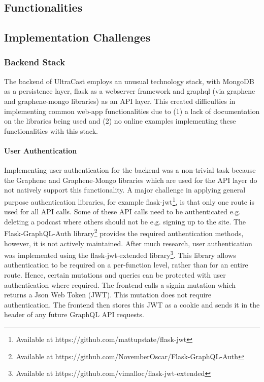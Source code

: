 \documentclass[../report.tex]{subfiles}
\begin{document}
   

\subsection{Functionalities}

\subsection{Implementation Challenges}

\subsubsection{Backend Stack}

The backend of UltraCast employs an unusual technology stack, with MongoDB as a persistence layer, flask as a webserver framework and graphql (via graphene and graphene-mongo libraries) as an API layer.
This created difficulties in implementing common web-app functionalities due to (1) a lack of documentation on the libraries being used and (2) no online examples implementing these functionalities with this stack.

\paragraph{User Authentication}

Implementing user authentication for the backend was a non-trivial task because the Graphene and Graphene-Mongo libraries which are used for the API layer do not natively support this functionality.
A major challenge in applying general purpose authentication libraries, for example flask-jwt\footnote{Available at https://github.com/mattupstate/flask-jwt}, is that only one route is used for all API calls.
Some of these API calls need to be authenticated e.g. deleting a podcast where others should not be e.g. signing up to the site.
The Flask-GraphQL-Auth library\footnote{Available at https://github.com/NovemberOscar/Flask-GraphQL-Auth} provides the required authentication methods, however, it is not actively maintained.
After much research, user authentication was implemented using the flask-jwt-extended library\footnote{Available at https://github.com/vimalloc/flask-jwt-extended}.
This library allows authentication to be required on a per-function level, rather than for an entire route.
Hence, certain mutations and queries can be protected with user authentication where required.
The frontend calls a signin mutation which returns a Json Web Token (JWT).
This mutation does not require authentication.
The frontend then stores this JWT as a cookie and sends it in the header of any future GraphQL API requests.
\end{document}
